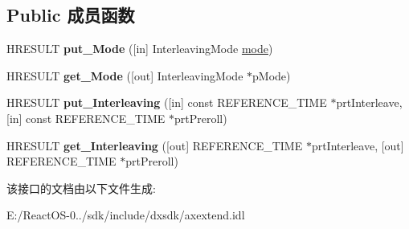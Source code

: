 \subsection*{Public 成员函数}
\begin{DoxyCompactItemize}
\item 
\mbox{\label{interface_i_config_interleaving_ab73d392469a91bdd1798346cb05b29d7}} 
H\+R\+E\+S\+U\+LT {\bfseries put\+\_\+\+Mode} (\mbox{[}in\mbox{]} Interleaving\+Mode \hyperlink{interfacevoid}{mode})
\item 
\mbox{\label{interface_i_config_interleaving_abbb54aa1117f1d36a45f8846e59fd574}} 
H\+R\+E\+S\+U\+LT {\bfseries get\+\_\+\+Mode} (\mbox{[}out\mbox{]} Interleaving\+Mode $\ast$p\+Mode)
\item 
\mbox{\label{interface_i_config_interleaving_ae4a28df11820da7f77899bb1b35300a6}} 
H\+R\+E\+S\+U\+LT {\bfseries put\+\_\+\+Interleaving} (\mbox{[}in\mbox{]} const R\+E\+F\+E\+R\+E\+N\+C\+E\+\_\+\+T\+I\+ME $\ast$prt\+Interleave, \mbox{[}in\mbox{]} const R\+E\+F\+E\+R\+E\+N\+C\+E\+\_\+\+T\+I\+ME $\ast$prt\+Preroll)
\item 
\mbox{\label{interface_i_config_interleaving_a62916d80e09816af37e52e1a79041ad7}} 
H\+R\+E\+S\+U\+LT {\bfseries get\+\_\+\+Interleaving} (\mbox{[}out\mbox{]} R\+E\+F\+E\+R\+E\+N\+C\+E\+\_\+\+T\+I\+ME $\ast$prt\+Interleave, \mbox{[}out\mbox{]} R\+E\+F\+E\+R\+E\+N\+C\+E\+\_\+\+T\+I\+ME $\ast$prt\+Preroll)
\end{DoxyCompactItemize}


该接口的文档由以下文件生成\+:\begin{DoxyCompactItemize}
\item 
E\+:/\+React\+O\+S-\/0../sdk/include/dxsdk/axextend.\+idl\end{DoxyCompactItemize}
